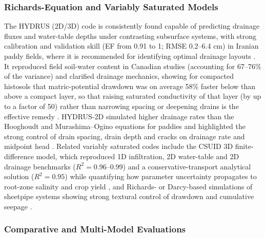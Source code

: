 \subsubsection{Richards-Equation and Variably Saturated Models}

The HYDRUS (2D/3D) code is consistently found capable of predicting drainage fluxes and water-table depths under contrasting subsurface systems, with strong calibration and validation skill (EF from 0.91 to 1; RMSE 0.2--6.4 cm) in Iranian paddy fields, where it is recommended for identifying optimal drainage layouts \parencite{Karandish2018,DarziNaftchali2018}. It reproduced field soil-water content in Canadian studies (accounting for 67--76\% of the variance) and clarified drainage mechanics, showing for compacted histosols that matric-potential drawdown was on average 58\% faster below than above a compact layer, so that raising saturated conductivity of that layer (by up to a factor of 50) rather than narrowing spacing or deepening drains is the effective remedy \parencite{Mante2018,Guedessou2021}. HYDRUS-2D simulated higher drainage rates than the Hooghoudt and Murashima--Ogino equations for paddies and highlighted the strong control of drain spacing, drain depth and cracks on drainage rate and midpoint head \parencite{Ebrahimian2015}. Related variably saturated codes include the CSUID 3D finite-difference model, which reproduced 1D infiltration, 2D water-table and 2D drainage benchmarks ($R^2=0.96$--0.99) and a conservative-transport analytical solution ($R^2=0.95$) while quantifying how parameter uncertainty propagates to root-zone salinity and crop yield \parencite{Alzraiee2013b,Alzraiee2013}, and Richards- or Darcy-based simulations of sheetpipe systems showing strong textural control of drawdown and cumulative seepage \parencite{Saptomo2021,Li2021}.

\subsubsection{Comparative and Multi-Model Evaluations}

